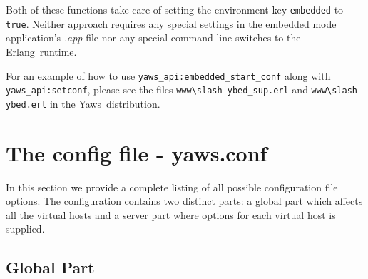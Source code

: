\documentclass[11pt,oneside,english]{book}
\newcommand{\Erlang}            %
        {{\sc Erlang}}
\newcommand{\Yaws}            %
        {{\sc Yaws}}
\begin{document}
Both of these functions take care of setting the environment key
\verb+embedded+ to \verb+true+. Neither approach requires any special
settings in the embedded mode application's \textit{.app} file nor any
special command-line switches to the \Erlang\  runtime.

For an example of how to use \verb+yaws_api:embedded_start_conf+ along
with \verb+yaws_api:setconf+, please see the files
\verb+www\slash ybed_sup.erl+ and \verb+www\slash ybed.erl+ in the
\Yaws\  distribution.

\chapter{The config file - yaws.conf}

In this section we provide a complete listing of all possible
configuration file options.  The configuration contains two distinct
parts: a global part which affects all the virtual hosts and a server
part where options for each virtual host is supplied.

\section{Global Part}
\end{document}
